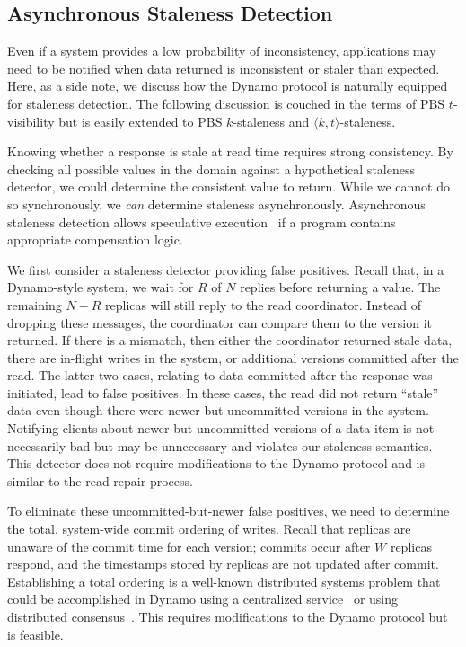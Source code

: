 \documentclass{vldb}
\newcommand{\subsectionskip}{-0em}
\begin{document}
\vspace{\subsectionskip}\subsection{Asynchronous Staleness Detection}

Even if a system provides a low probability of inconsistency,
applications may need to be notified when data returned is
inconsistent or staler than expected.  Here, as a side note, we
discuss how the Dynamo protocol is naturally equipped for staleness
detection.  The following discussion is couched in the terms of PBS
$t$-visibility but is easily extended to PBS $k$-staleness and
$\langle k, t \rangle$-staleness.

Knowing whether a response is stale at read time requires strong
consistency.  By checking all possible values in the domain against a
hypothetical staleness detector, we could determine the consistent
value to return.  While we cannot do so synchronously, we \textit{can}
determine staleness asynchronously.  Asynchronous staleness detection
allows speculative execution~\cite{nsdispeculation} if a program
contains appropriate compensation logic.

We first consider a staleness detector providing false positives.
Recall that, in a Dynamo-style system, we wait for $R$ of $N$ replies
before returning a value.  The remaining $N-R$ replicas will still
reply to the read coordinator.  Instead of dropping these messages,
the coordinator can compare them to the version it returned.  If there
is a mismatch, then either the coordinator returned stale data, there
are in-flight writes in the system, or additional versions committed
after the read. The latter two cases, relating to data committed after
the response was initiated, lead to false positives.  In these cases,
the read did not return ``stale'' data even though there were newer
but uncommitted versions in the system.  Notifying clients about newer
but uncommitted versions of a data item is not necessarily bad but may
be unnecessary and violates our staleness semantics.  This detector
does not require modifications to the Dynamo protocol and is similar
to the read-repair process.

To eliminate these uncommitted-but-newer false positives, we need to
determine the total, system-wide commit ordering of writes. Recall
that replicas are unaware of the commit time for each version; commits
occur after $W$ replicas respond, and the timestamps stored by
replicas are not updated after commit.  Establishing a total ordering
is a well-known distributed systems problem that could be accomplished
in Dynamo using a centralized service~\cite{zookeeper} or using
distributed consensus~\cite{paxos}. This requires modifications to the
Dynamo protocol but is feasible.
\end{document}
